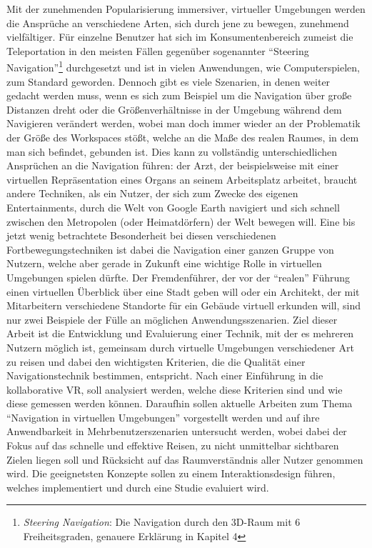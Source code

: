 Mit der zunehmenden Popularisierung immersiver, virtueller Umgebungen werden die Ansprüche an verschiedene Arten, sich durch jene zu bewegen, zunehmend vielfältiger.
Für einzelne Benutzer hat sich im Konsumentenbereich zumeist die Teleportation in den meisten Fällen gegenüber sogenannter “Steering Navigation”\footnote{\textit{Steering Navigation}: Die Navigation durch den 3D-Raum mit 6 Freiheitsgraden, genauere Erklärung in Kapitel 4} durchgesetzt und ist in vielen Anwendungen, wie Computerspielen, zum Standard geworden. 
Dennoch gibt es viele Szenarien, in denen weiter gedacht werden muss, wenn es sich zum Beispiel um die Navigation über große Distanzen dreht oder die Größenverhältnisse in der Umgebung während dem Navigieren verändert werden, wobei man doch immer wieder an der Problematik der Größe des Workspaces stößt, welche an die Maße des realen Raumes, in dem man sich befindet, gebunden ist.
Dies kann zu vollständig unterschiedlichen Ansprüchen an die Navigation führen: der Arzt, der  beispielsweise mit einer virtuellen Repräsentation eines Organs an seinem Arbeitsplatz arbeitet, braucht andere Techniken, als ein Nutzer, der sich zum Zwecke des eigenen Entertainments, durch die Welt von Google Earth navigiert und sich schnell zwischen den Metropolen (oder Heimatdörfern) der Welt bewegen will. Eine bis jetzt wenig betrachtete Besonderheit bei diesen verschiedenen Fortbewegungstechniken ist dabei die Navigation einer ganzen Gruppe von Nutzern, welche aber gerade in Zukunft eine wichtige Rolle in virtuellen Umgebungen spielen dürfte. Der Fremdenführer, der vor der “realen” Führung einen virtuellen Überblick über eine Stadt geben will oder ein Architekt, der mit Mitarbeitern verschiedene Standorte für ein Gebäude virtuell erkunden will, sind nur zwei Beispiele der Fülle an möglichen Anwendungsszenarien.
Ziel dieser Arbeit ist die Entwicklung und Evaluierung einer Technik, mit der es mehreren Nutzern möglich ist, gemeinsam durch virtuelle Umgebungen verschiedener Art zu reisen und dabei den wichtigsten Kriterien, die die Qualität einer Navigationstechnik bestimmen, entspricht. Nach einer Einführung in die kollaborative VR, soll analysiert werden, welche diese Kriterien sind und wie diese gemessen werden können.
Daraufhin sollen aktuelle Arbeiten zum Thema “Navigation in virtuellen Umgebungen” vorgestellt werden und auf ihre Anwendbarkeit in Mehrbenutzerszenarien untersucht werden, wobei dabei der Fokus auf das schnelle und effektive Reisen, zu nicht unmittelbar sichtbaren Zielen liegen soll und Rücksicht auf das Raumverständnis aller Nutzer genommen wird.
Die geeignetsten Konzepte sollen zu einem Interaktionsdesign führen, welches implementiert und durch eine Studie evaluiert wird.

